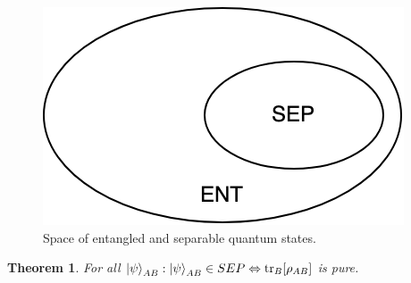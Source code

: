 \documentclass{article}
\newtheorem{theorem}{Theorem}
\begin{document}
\begin{figure}[h]
    \centering
    \includegraphics[scale=0.4]{space-of-q-states.png}
    \caption{Space of entangled and separable quantum states.}
\end{figure}
\begin{theorem}
    For all $\ket{\psi}_{AB} : \ket{\psi}_{AB} \in SEP \Leftrightarrow
    \text{tr}_B[\rho_{AB}]$ is pure.
\end{theorem}
\end{document}
